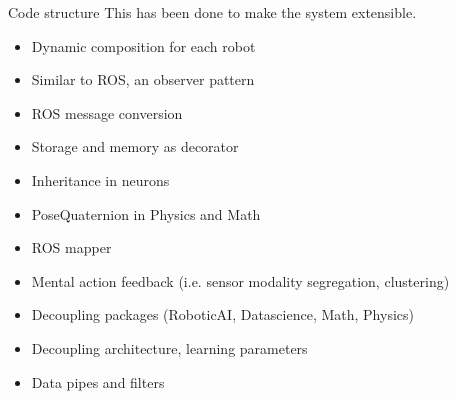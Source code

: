\begin{frame}[allowframebreaks]{Code structure}
    This has been done to make the system extensible.
    \begin{itemize}
        \item Dynamic composition for each robot
        \item Similar to ROS, an observer pattern
        \item ROS message conversion
        \item Storage and memory as decorator
        \item Inheritance in neurons
        \item PoseQuaternion in Physics and Math
        \item ROS mapper
        \item Mental action feedback (i.e. sensor modality segregation, clustering)
        \item Decoupling packages (RoboticAI, Datascience, Math, Physics)
        \item Decoupling architecture,  learning parameters
        \item Data pipes and filters
    
    \end{itemize}
\end{frame}